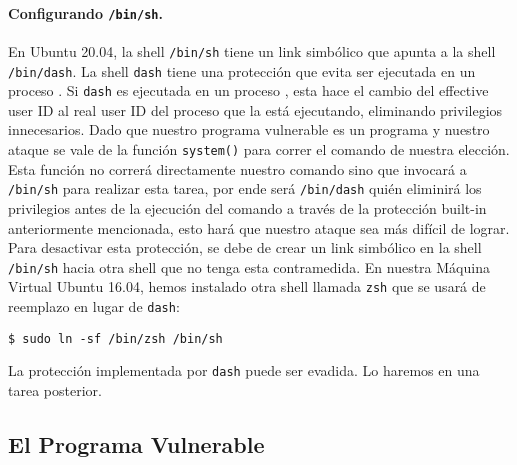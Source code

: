 \paragraph{Configurando \texttt{/bin/sh}.} En Ubuntu 20.04, la shell \texttt{/bin/sh} tiene un link simbólico que apunta a la shell \texttt{/bin/dash}.
La shell \texttt{dash} tiene una protección que evita ser ejecutada en un proceso 
\setuid. Si \texttt{dash} es ejecutada en un proceso \setuid, esta hace el cambio del effective user ID al real user ID del proceso que la está ejecutando, eliminando privilegios innecesarios.
Dado que nuestro programa vulnerable es un programa \setuid y nuestro ataque se vale de la función \texttt{system()} para correr el comando de nuestra elección. Esta función no correrá directamente nuestro comando sino que invocará a \texttt{/bin/sh} para realizar esta tarea, por ende será \texttt{/bin/dash} quién eliminirá los privilegios antes de la ejecución del comando a través de la protección built-in anteriormente mencionada, esto hará que nuestro ataque sea más difícil de lograr. Para desactivar esta protección, se debe de crear un link simbólico en la shell \texttt{/bin/sh} hacia otra shell que no tenga esta contramedida.
En nuestra Máquina Virtual Ubuntu 16.04, hemos instalado otra shell llamada \texttt{zsh} que se usará de reemplazo en lugar de \texttt{dash}:

\begin{lstlisting}
$ sudo ln -sf /bin/zsh /bin/sh
\end{lstlisting}

La protección implementada por \texttt{dash} puede ser evadida. Lo haremos en una tarea posterior.



\subsection{El Programa Vulnerable}
\label{sec:vulnerable_program}

